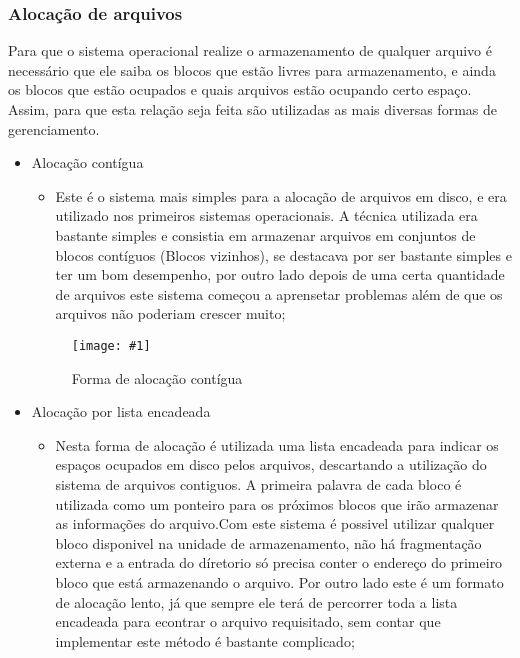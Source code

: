 \documentclass[
	12pt,				%
	openright,			%
	twoside,			%
	a4paper,			%
	chapter=TITLE,		%
	section=TITLE,		%
	english,	
	brazil				%
]{abntex2}
\newcommand{\imagem}[3]{
	\begin{figure}[htb]
		\begin{center}
			\texttt{[image: \#1]}
		\end{center}
		\caption{#2}%
	\end{figure}	
}
\begin{document}
\subsubsection{Alocação de arquivos}

 Para que o sistema operacional realize o armazenamento de qualquer arquivo é necessário que ele saiba os blocos que estão livres para armazenamento, e ainda os blocos que estão ocupados e quais arquivos estão ocupando certo espaço. Assim, para que esta relação seja feita são utilizadas as mais diversas formas de gerenciamento.

\begin{itemize}

\item Alocação contígua

	\begin{itemize}
		\item Este é o sistema mais simples para a alocação de arquivos em disco, e era utilizado nos primeiros sistemas operacionais. A técnica utilizada era bastante simples e consistia em armazenar arquivos em conjuntos de blocos contíguos (Blocos vizinhos), se destacava por ser bastante simples e ter um bom desempenho, por outro lado depois de uma certa quantidade de arquivos este sistema começou a aprensetar problemas além de que os arquivos não poderiam crescer muito;
	\end{itemize}

\imagem{alocContig.jpg}{Forma de alocação contígua}{rótulo_para_referência}

\item Alocação por lista encadeada
	
	\begin{itemize}
		\item Nesta forma de alocação é utilizada uma lista encadeada para indicar os espaços ocupados em disco pelos arquivos, descartando a utilização do sistema de arquivos contiguos. A primeira palavra de cada bloco é utilizada como um ponteiro para os próximos blocos que irão armazenar as informações do arquivo.Com este sistema é possivel utilizar qualquer bloco disponivel na unidade de armazenamento, não há fragmentação externa e a entrada do díretorio só precisa conter o endereço do primeiro bloco que está armazenando o arquivo. Por outro lado este é um formato de alocação lento, já que sempre ele terá de percorrer toda a lista encadeada para econtrar o arquivo requisitado, sem contar que implementar este método é bastante complicado;
	\end{itemize}


\end{itemize}
\end{document}
